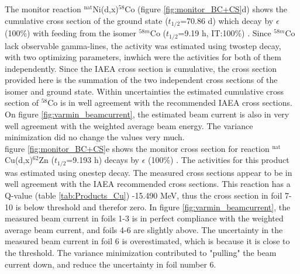 \noindent 
The monitor reaction $^\text{nat}$Ni(d,x)$^{58}$Co (figure \ref{fig:monitor_BC+CS}d) shows the cumulative cross section of the ground state ($t_{1/2}$=70.86 d) which decay by $\epsilon$ (100\%) with feeding from the isomer $^{58m}$Co ($t_{1/2}$=9.19 h, IT:100\%) \cite{Nesaraja2010}. Since $^{58m}$Co lack observable gamma-lines, the activity was estimated using twostep decay, with two optimizing parameters, inwhich were the activities for both of them independently. Since the IAEA cross section is cumulative, the cross section provided here is the summation of the two independent cross sections of the isomer and ground state. Within uncertainties the estimated cumulative cross section of $^{58}$Co is in well agreement with the recommended IAEA cross sections. On figure \ref{fig:varmin_beamcurrent}, the estimated beam current is also in very well agreement with the weighted average beam energy. The variance minimization did no change the values very much.    \\

\noindent
figure \ref{fig:monitor_BC+CS}e shows the monitor cross section for reaction $^\text{nat}$Cu(d,x)$^{62}$Zn ($t_{1/2}$=9.193 h) decays by $\epsilon$ (100\%) \cite{Nichols2012}. The activities for this product was estimated using onestep decay. The measured cross sections appear to be in well agreement with the IAEA recommended cross sections. This reaction has a Q-value (table \ref{tab:Products_Cu}) -15.490 MeV, thus the cross section in foil 7-10 is below threshold and therefor zero. In figure \ref{fig:varmin_beamcurrent}, the measured beam current in foils 1-3 is in perfect compliance with the weighted average beam current, and foils 4-6 are slightly above. The uncertainty in the measured beam current in foil 6 is overestimated, which is because it is close to the threshold. The variance minimization contributed to "pulling" the beam current down, and reduce the uncertainty in foil number 6. \\

